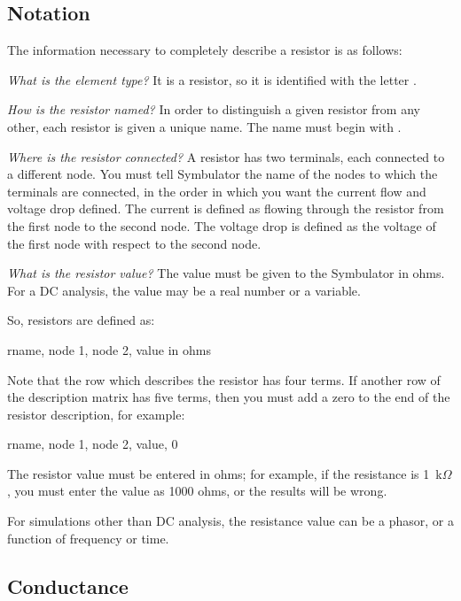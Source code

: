 \subsection{Notation}

The information necessary to completely describe a resistor is as
follows:

\emph{What is the element type?} It is a resistor, so it is
identified with the letter .

\emph{How is the resistor named?} In order to distinguish a given
resistor from any other, each resistor is given a unique name. The
name must begin with .

\emph{Where is the resistor connected?} A resistor has two
terminals, each connected to a different node. You must tell
Symbulator the name of the nodes to which the terminals are
connected, in the order in which you want the current flow and
voltage drop defined. The current is defined as flowing through the
resistor from the first node to the second node. The voltage drop is
defined as the voltage of the first node with respect to the second
node.

\emph{What is the resistor value?} The value must be given to the
Symbulator in ohms. For a DC analysis, the value may be a real
number or a variable.

So, resistors are defined as:

\begin{entry}
rname, node 1, node 2, value in ohms
\end{entry}

Note that the row which describes the resistor has four terms. If
another row of the description matrix has five terms, then you must
add a zero to the end of the resistor description, for example:

\begin{entry}
rname, node 1, node 2, value, 0
\end{entry}

The resistor value must be entered in ohms; for example, if the
resistance is 1~k$\Omega$, you must enter the value as 1000 ohms, or
the results will be wrong.

For simulations other than DC analysis, the resistance value can be
a phasor, or a function of frequency or time.

\subsection{Conductance}

